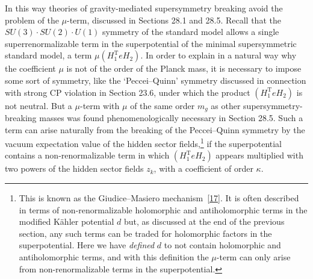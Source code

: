 In this way theories of gravity-mediated supersymmetry breaking avoid the
problem of the \(\mu\)-term, discussed in Sections 28.1 and 28.5. Recall
that the \(SU(3)\cdot SU(2)\cdot U(1)\) symmetry of the standard model
allows a single superrenormalizable term in the superpotential of the
minimal supersymmetric standard model, a term \(\mu(H_1^{\mathrm T}eH_2)\).
In order to explain in a natural way why the coefficient \(\mu\) is not of
the order of the Planck mass, it is necessary to impose some sort of
symmetry, like the `Peccei--Quinn' symmetry discussed in connection with
strong CP violation in Section 23.6, under which the product
\((H_1^{\mathrm T}eH_2)\) is not neutral. But a \(\mu\)-term with \(\mu\)
of the same order \(m_g\) as other supersymmetry-breaking masses was found
phenomenologically necessary in Section 28.5. Such a term can arise
naturally from the breaking of the Peccei--Quinn symmetry by the vacuum
expectation value of the hidden sector fields,\footnote{This is known as
the Giudice--Masiero mechanism~\hyperref[ch31-ref-17]{[17]}. It is often
described in terms of non-renormalizable holomorphic and antiholomorphic
terms in the modified Kähler potential \(d\) but, as discussed at the end
of the previous section, any such terms can be traded for holomorphic
factors in the superpotential. Here we have \emph{defined} \(d\) to not
contain holomorphic and antiholomorphic terms, and with this definition the
\(\mu\)-term can only arise from non-renormalizable terms in the
superpotential.} if the superpotential contains a non-renormalizable term
in which \((H_1^{\mathrm T}eH_2)\) appears multiplied with two powers of the
hidden sector fields \(z_k\), with a coefficient of order \(\kappa\).

